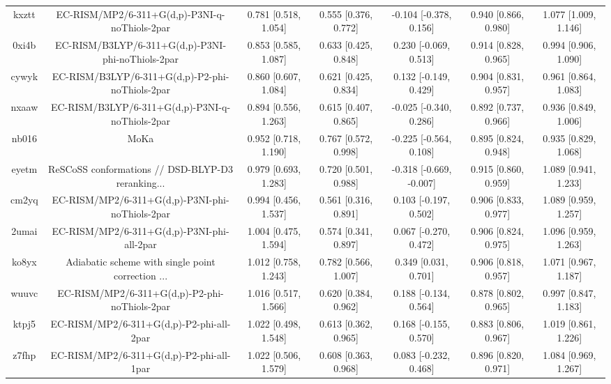 \documentclass{article}
\begin{document}
\begin{center}
\begin{longtable}{|ccccccc|}
 kxztt &      EC-RISM/MP2/6-311+G(d,p)-P3NI-q-noThiols-2par &  0.781 [0.518, 1.054] &  0.555 [0.376, 0.772] &   -0.104 [-0.378, 0.156] &  0.940 [0.866, 0.980] &   1.077 [1.009, 1.146] \\
 0xi4b &  EC-RISM/B3LYP/6-311+G(d,p)-P3NI-phi-noThiols-2par &  0.853 [0.585, 1.087] &  0.633 [0.425, 0.848] &    0.230 [-0.069, 0.513] &  0.914 [0.828, 0.965] &   0.994 [0.906, 1.090] \\
 cywyk &    EC-RISM/B3LYP/6-311+G(d,p)-P2-phi-noThiols-2par &  0.860 [0.607, 1.084] &  0.621 [0.425, 0.834] &    0.132 [-0.149, 0.429] &  0.904 [0.831, 0.957] &   0.961 [0.864, 1.083] \\
 nxaaw &    EC-RISM/B3LYP/6-311+G(d,p)-P3NI-q-noThiols-2par &  0.894 [0.556, 1.263] &  0.615 [0.407, 0.865] &   -0.025 [-0.340, 0.286] &  0.892 [0.737, 0.966] &   0.936 [0.849, 1.006] \\
 nb016 &                                               MoKa &  0.952 [0.718, 1.190] &  0.767 [0.572, 0.998] &   -0.225 [-0.564, 0.108] &  0.895 [0.824, 0.948] &   0.935 [0.829, 1.068] \\
 eyetm &  ReSCoSS conformations // DSD-BLYP-D3 reranking... &  0.979 [0.693, 1.283] &  0.720 [0.501, 0.988] &  -0.318 [-0.669, -0.007] &  0.915 [0.860, 0.959] &   1.089 [0.941, 1.233] \\
 cm2yq &    EC-RISM/MP2/6-311+G(d,p)-P3NI-phi-noThiols-2par &  0.994 [0.456, 1.537] &  0.561 [0.316, 0.891] &    0.103 [-0.197, 0.502] &  0.906 [0.833, 0.977] &   1.089 [0.959, 1.257] \\
 2umai &         EC-RISM/MP2/6-311+G(d,p)-P3NI-phi-all-2par &  1.004 [0.475, 1.594] &  0.574 [0.341, 0.897] &    0.067 [-0.270, 0.472] &  0.906 [0.824, 0.975] &   1.096 [0.959, 1.263] \\
 ko8yx &  Adiabatic scheme with single point correction ... &  1.012 [0.758, 1.243] &  0.782 [0.566, 1.007] &     0.349 [0.031, 0.701] &  0.906 [0.818, 0.957] &   1.071 [0.967, 1.187] \\
 wuuvc &      EC-RISM/MP2/6-311+G(d,p)-P2-phi-noThiols-2par &  1.016 [0.517, 1.566] &  0.620 [0.384, 0.962] &    0.188 [-0.134, 0.564] &  0.878 [0.802, 0.965] &   0.997 [0.847, 1.183] \\
 ktpj5 &           EC-RISM/MP2/6-311+G(d,p)-P2-phi-all-2par &  1.022 [0.498, 1.548] &  0.613 [0.362, 0.965] &    0.168 [-0.155, 0.570] &  0.883 [0.806, 0.967] &   1.019 [0.861, 1.226] \\
 z7fhp &           EC-RISM/MP2/6-311+G(d,p)-P2-phi-all-1par &  1.022 [0.506, 1.579] &  0.608 [0.363, 0.968] &    0.083 [-0.232, 0.468] &  0.896 [0.820, 0.971] &   1.084 [0.969, 1.267] \\

\end{longtable}
\end{center}
\end{document}
